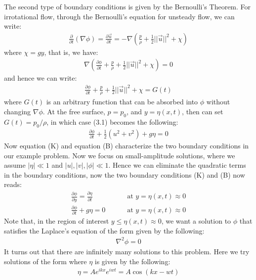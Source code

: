 \documentclass[11pt]{book}
\theoremstyle{break}
\theoremstyle{break}
\begin{document}
The second type of boundary conditions is given by the Bernoulli's Theorem. For irrotational flow, through the Bernoulli's equation for unsteady flow, we can write:
\begin{align*}
\frac{\partial }{\partial t}\left( \nabla \phi\right) =  \frac{\partial \vec{u}}{\partial t} = -\nabla \left( \frac{p}{\rho} + \frac{1}{2}||\vec{u}||^2 + \chi\right)
\end{align*}
where $\chi = gy$, that is, we have:
\begin{align*}
\nabla \left( \frac{\partial \phi}{\partial t} + \frac{p}{\rho} + \frac{1}{2}||\vec{u}||^2 + \chi\right)= 0
\end{align*}
and hence we can write:
\begin{align}
\frac{\partial \phi}{\partial t} + \frac{p}{\rho} + \frac{1}{2}||\vec{u}||^2 + \chi = G(t) 
\end{align}
where $G(t)$ is an arbitrary function that can be absorbed into $\phi$ without changing $\nabla \phi$. 
At the free surface, $p = p_0$, and $y = \eta(x,t)$, then can set $G(t) = p_0 / \rho$, in which case (3.1) becomes the following:
\begin{align*}
\frac{\partial \phi}{\partial t} + \frac{1}{2}\left(u^2 + v^2\right) + g\eta = 0 \tag{B}
\end{align*}
Now equation (K) and equation (B) characterize the two boundary conditions in our example problem. 
Now we focus on small-amplitude solutions, where we assume $|\eta| \ll 1$ and $|u|,|v|,|\phi| \ll 1$. Hence we can eliminate the quadratic terms in the boundary conditions, now the two boundary conditions (K) and (B) now reads:
\begin{align*}
\frac{\partial \phi}{\partial y}  = \frac{\partial \eta}{\partial t} \qquad&\text{ at } y = \eta(x,t) \approx 0 \tag{K1}\\ 
\frac{\partial \phi}{\partial t} + g\eta = 0\qquad&\text{ at } y = \eta(x,t) \approx 0  \tag{B1}
\end{align*}
Note that, in the region of interest $y \leq \eta(x,t) \approx 0$, we want a solution to $\phi$ that satisfies the Laplace's equation of the form given by the following: 
\begin{align*}
\nabla^2 \phi = 0
\end{align*}
It turns out that there are infinitely many solutions to this problem. Here we try solutions of the form where $\eta$ is given by the following:
\begin{align*}
\eta = Ae^{ikx} e^{iw t} = A\cos(kx - wt)
\end{align*}
\end{document}

